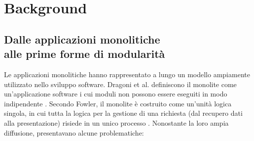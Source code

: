  \chapter{Background}

\section[Dalle applicazioni monolitiche alle prime forme di modularità]%
{Dalle applicazioni monolitiche \\ alle prime forme di modularità}
Le applicazioni monolitiche hanno rappresentato a lungo un modello ampiamente utilizzato nello sviluppo software. Dragoni et al. definiscono il monolite come un’applicazione software i cui moduli non possono essere eseguiti in modo indipendente \cite{Dragoni2017}.
Secondo Fowler, il monolite è costruito come un'unità logica singola, in cui tutta la logica per la gestione di una richiesta (dal recupero dati alla presentazione) risiede in un unico processo \cite{Fowler2014}.
Nonostante la loro ampia diffusione, presentavano alcune problematiche: 
